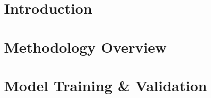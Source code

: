 \documentclass[a4paper,12pt]{article}
\begin{document}
	\pagebreak
	
	\tableofcontents
	
	\pagebreak
	
	\section{Introduction}
	\section{Methodology Overview}
	
	\section{Model Training \& Validation}
	
\end{document}
